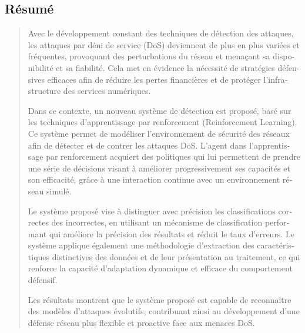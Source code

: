 \documentclass[12pt]{report}
\begin{document}
\newpage
\begin{otherlanguage}{french}
\chapter*{Résumé}

\begin{quote}
\large
Avec le développement constant des techniques de détection des attaques, les attaques par déni de service (DoS) deviennent de plus en plus variées et fréquentes, provoquant des perturbations du réseau et menaçant sa disponibilité et sa fiabilité. Cela met en évidence la nécessité de stratégies défensives efficaces afin de réduire les pertes financières et de protéger l’infrastructure des services numériques.

Dans ce contexte, un nouveau système de détection est proposé, basé sur les techniques d’apprentissage par renforcement (Reinforcement Learning). Ce système permet de modéliser l’environnement de sécurité des réseaux afin de détecter et de contrer les attaques DoS. L’agent dans l’apprentissage par renforcement acquiert des politiques qui lui permettent de prendre une série de décisions visant à améliorer progressivement ses capacités et son efficacité, grâce à une interaction continue avec un environnement réseau simulé.

Le système proposé vise à distinguer avec précision les classifications correctes des incorrectes, en utilisant un mécanisme de classification performant qui améliore la précision des résultats et réduit le taux d’erreurs. Le système applique également une méthodologie d’extraction des caractéristiques distinctives des données et de leur présentation au traitement, ce qui renforce la capacité d’adaptation dynamique et efficace du comportement défensif.

Les résultats montrent que le système proposé est capable de reconnaître des modèles d’attaques évolutifs, contribuant ainsi au développement d’une défense réseau plus flexible et proactive face aux menaces DoS.
\end{quote}

\vspace{1em}
\end{otherlanguage}


\tableofcontents
\newpage
\end{document}
